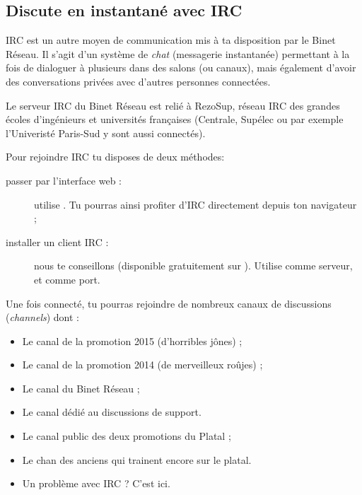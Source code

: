 %
\subsection{Discute en instantané avec IRC}

\label{irc}

IRC est un autre moyen de communication mis à ta disposition par le Binet Réseau.
Il s'agit d'un système de \emph{chat} (messagerie instantanée) permettant à la fois de dialoguer à plusieurs dans des salons (ou canaux),
mais également d'avoir des conversations privées avec d'autres personnes connectées.


Le serveur IRC du Binet Réseau est relié à RezoSup, réseau IRC des grandes écoles d'ingénieurs et universités françaises (Centrale, Supélec ou par exemple l'Univeristé Paris-Sud y sont aussi connectés).

Pour rejoindre IRC tu disposes de deux méthodes:

\begin{description}
  \item[passer par l'interface web :] utilise . Tu pourras ainsi profiter d'IRC directement depuis ton navigateur ;
  \item[installer un client IRC :] nous te conseillons  (disponible gratuitement sur \linebreak {}). Utilise   comme serveur, et  comme port.
\end{description}

Une fois connecté, tu pourras rejoindre de nombreux canaux de discussions (\emph{channels}) dont :
\begin{itemize}
  \item {} Le canal de la promotion 2015 (d'horribles jônes) ;
   \item {} Le canal de la promotion 2014 (de merveilleux roûjes) ;
  \item {} Le canal du Binet Réseau ;
  \item {} Le canal dédié au discussions de support.
  \item {} Le canal public des deux promotions du Platal ;
  \item {} Le chan des anciens qui trainent encore sur le platal.
  \item {} Un problème avec IRC ? C'est ici.
\end{itemize}

